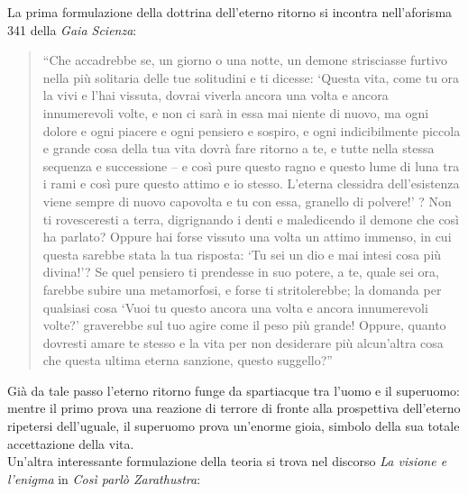 \documentclass[10pt]{report}
\begin{document}
		La prima formulazione della dottrina dell'eterno ritorno si incontra nell'aforisma 341 della \textit{Gaia Scienza}:
		\begin{quotation}
			 ``Che accadrebbe se, un giorno o una notte, un demone strisciasse furtivo nella più solitaria delle tue solitudini e ti dicesse: ‘Questa vita, come tu ora la vivi e l’hai vissuta, dovrai viverla ancora una volta e ancora innumerevoli volte, e non ci sarà in essa mai niente di nuovo, ma ogni dolore e ogni piacere e ogni pensiero e sospiro, e ogni indicibilmente piccola e grande cosa della tua vita dovrà fare ritorno a te, e tutte nella stessa sequenza e successione – e così pure questo ragno e questo lume di luna tra i rami e così pure questo attimo e io stesso. L’eterna clessidra dell’esistenza viene sempre di nuovo capovolta e tu con essa, granello di polvere!’ ? Non ti rovesceresti a terra, digrignando i denti e maledicendo il demone che così ha parlato? Oppure hai forse vissuto una volta un attimo immenso, in cui questa sarebbe stata la tua risposta: ‘Tu sei un dio e mai intesi cosa più divina!’? Se quel pensiero ti prendesse in suo potere, a te, quale sei ora, farebbe subire una metamorfosi, e forse ti stritolerebbe; la domanda per qualsiasi cosa ‘Vuoi tu questo ancora una volta e ancora innumerevoli volte?’ graverebbe sul tuo agire come il peso più grande! Oppure, quanto dovresti amare te stesso e la vita per non desiderare più alcun’altra cosa che questa ultima eterna sanzione, questo suggello?''
		\end{quotation}
		Già da tale passo l'eterno ritorno funge da spartiacque tra l'uomo e il superuomo: mentre il primo prova una reazione di terrore di fronte alla prospettiva dell'eterno ripetersi dell'uguale, il superuomo prova un'enorme gioia, simbolo della sua totale accettazione della vita.\\
		Un'altra interessante formulazione della teoria si trova nel discorso \textit{La visione e l'enigma} in \textit{Così parlò Zarathustra}:
\end{document}
